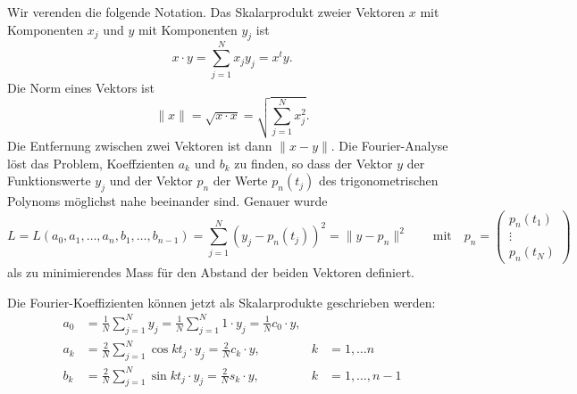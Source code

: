 Wir verenden die folgende Notation.
Das Skalarprodukt zweier Vektoren $x$ mit Komponenten $x_j$ und $y$ mit
Komponenten $y_j$ ist
\begin{equation}
x\cdot y
=
\sum_{j=1}^N x_jy_j
=
x^ty.
\end{equation}
Die Norm eines Vektors ist
\begin{equation}
\| x\| = \sqrt{x\cdot x} = \sqrt{\sum_{j=1}^N x_j^2}.
\end{equation}
Die Entfernung zwischen zwei Vektoren ist dann $\| x-y\|$.
Die Fourier-Analyse löst das Problem, Koeffzienten $a_k$ und $b_k$
zu finden, so dass der Vektor $y$ der Funktionswerte $y_j$ und
der Vektor $p_n$ der Werte $p_n(t_j)$ des trigonometrischen Polynoms
möglichst nahe beeinander sind.
Genauer wurde 
\begin{equation}
L=L(a_0,a_1,\dots,a_n,b_1,\dots,b_{n-1})
=
\sum_{j=1}^N (y_j - p_n(t_j))^2
=
\| y - p_n\|^2
\qquad\text{mit}\quad
p_n=\begin{pmatrix}
p_n(t_1)\\\vdots\\p_n(t_N)
\end{pmatrix}
\end{equation}
als zu minimierendes Mass für den Abstand der beiden Vektoren
definiert.

Die Fourier-Koeffizienten können jetzt als Skalarprodukte geschrieben werden:
\begin{align*}
a_0
&=
\frac1N\sum_{j=1}^N y_j
=
\frac1N\sum_{j=1}^N 1\cdot y_j 
=
\frac1N c_0\cdot y,
\\
a_k
&=
\frac{2}{N}\sum_{j=1}^N
\cos kt_j \cdot y_j
=
\frac2N c_k\cdot y,
&k&=1,\dots n
\\
b_k
&=
\frac2N \sum_{j=1}^N \sin kt_j \cdot y_j
=
\frac2N s_k\cdot y,&k&=1,\dots,n-1
\end{align*}

